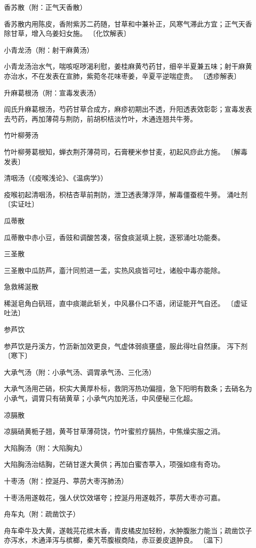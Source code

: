 \documentclass[a4paper,12pt,UTF8,twoside]{ctexbook}
\begin{document}
香苏散（附：正气天香散）

香苏散内用陈皮，香附紫苏二药随，甘草和中兼补正，风寒气滞此方宜；正气天香除甘草，增入乌姜妇女施。
〔化饮解表〕

小青龙汤（附：射干麻黄汤）

小青龙汤治水气，喘咳呕哕渴利慰，姜桂麻黄芍药甘，细辛半夏兼五味；射干麻黄亦治水，不在发表在宣肺，紫菀冬花味枣姜，辛夏平逆喘症贵。
〔透疹解表〕

升麻葛根汤（附：宣毒发表汤）

阎氏升麻葛根汤，芍药甘草合成方，麻疹初期出不透，升阳透表效彰彰；宣毒发表去芍药，再加薄荷与荆防，前胡枳桔淡竹叶，木通连翘共牛蒡。

竹叶柳蒡汤

竹叶柳蒡葛根知，蝉衣荆芥薄荷司，石膏粳米参甘麦，初起风痧此方施。
〔解毒发表〕

清咽汤（《疫喉浅论》、《温病学》）

疫喉初起清咽汤，枳桔杏草前荆防，泄卫透表薄浮萍，解毒僵蚕榄牛蒡。
涌吐剂
〔实证吐〕

瓜蒂散

瓜蒂散中赤小豆，香豉和调酸苦凑，宿食痰涎填上脘，逐邪涌吐功能奏。

三圣散

三圣散中瓜防芦，齑汁同煎进一盂，实热风痰皆可吐，诸般中毒亦能除。

急救稀涎散

稀涎皂角白矾班，直中痰潮此斩关，中风暴仆口不语，闭证能开气自还。
〔虚证吐法〕

参芦饮

参芦饮是丹溪方，竹沥新加效更良，气虚体弱痰壅盛，服此得吐自然康。
泻下剂
〔寒下〕

大承气汤（附：小承气汤、调胃承气汤、三化汤）

大承气汤用芒硝，枳实大黄厚朴标，救阴泻热功偏擅，急下阳明有数条；去硝名为小承气，调胃只有硝黄草；小承气内加羌活，中风便秘三化超。

凉膈散

凉膈硝黄栀子翘，黄芩甘草薄荷饶，竹叶蜜煎疗膈热，中焦燥实服之消。

大陷胸汤（附：大陷胸丸）

大陷胸汤治结胸，芒硝甘遂大黄供；再加白蜜杏葶入，项强如痉有奇功。

十枣汤（附：控涎丹、葶苈大枣泻肺汤）

十枣汤用遂戟花，强人伏饮效堪夸；控涎丹用遂戟芥，葶苈大枣亦可嘉。

舟车丸（附：疏凿饮子）

舟车牵牛及大黄，遂戟芫花槟木香，青皮橘皮加轻粉，水肿腹胀力能当；疏凿饮子亦泻水，木通泽泻与槟榔，秦艽苓腹椒商陆，赤豆姜皮退肿良。
〔温下〕
\end{document}
